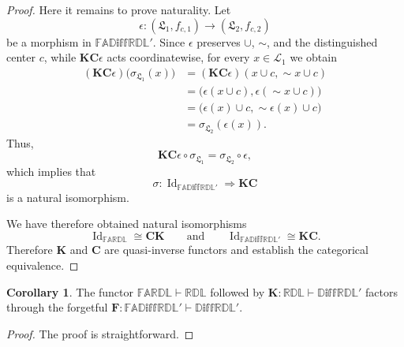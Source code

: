 \documentclass[final,12pt,times]{elsarticle}
\theoremstyle{plain}
\theoremstyle{definition}
\newtheorem{corollary}[definition]{Corollary}
\theoremstyle{break}
\begin{document}
\begin{proof}
Here it remains to prove naturality. Let
\[
\epsilon:(\boldsymbol{\mathfrak{L}}_1,f_{c,1})
  \longrightarrow(\boldsymbol{\mathfrak{L}}_2,f_{c,2})
\]
be a morphism in $\mathbb{FAD\text{iff}RDL'}$. Since $\epsilon$ preserves $\cup$, $\sim$, and the distinguished center $c$, while $\mathbf{K}\mathbf{C}\epsilon$ acts coordinatewise, for every $x\in\mathcal{L}_1$ we obtain
\[
\begin{aligned}
(\mathbf{K}\mathbf{C}\epsilon)
   \bigl(\sigma_{\boldsymbol{\mathfrak{L}}_1}(x)\bigr)
  &=(\mathbf{K}\mathbf{C}\epsilon)(x\cup c,\sim x\cup c)\\
  &=\bigl(\epsilon(x\cup c),\epsilon(\sim x\cup c)\bigr)\\
  &=\bigl(\epsilon(x)\cup c,\sim\epsilon(x)\cup c\bigr)\\
  &=\sigma_{\boldsymbol{\mathfrak{L}}_2}(\epsilon(x)).
\end{aligned}
\]
Thus,
\[
\mathbf{K}\mathbf{C}\epsilon\circ\sigma_{\boldsymbol{\mathfrak{L}}_1}
   =\sigma_{\boldsymbol{\mathfrak{L}}_2}\circ\epsilon,
\]
which implies that
\[
\sigma:\operatorname{Id}_{\mathbb{FAD\text{iff}RDL'}}
   \Longrightarrow\mathbf{K}\mathbf{C}
\]
is a natural isomorphism.

We have therefore obtained natural isomorphisms
\[
\operatorname{Id}_{\mathbb{FARDL}}\cong\mathbf{C}\mathbf{K}
\qquad\text{and}\qquad
\operatorname{Id}_{\mathbb{FAD\text{iff}RDL'}}\cong\mathbf{K}\mathbf{C}.
\]
Therefore $\mathbf{K}$ and $\mathbf{C}$ are quasi-inverse functors and establish the categorical equivalence.
\end{proof}

\begin{corollary}\label{corollary5.16}
    The functor $\mathbb{FARDL}\vdash \mathbb{RDL}$ followed by $\mathbf{K}:\mathbb{RDL}\vdash \mathbb{D\text{iff}RDL'}$ factors through the forgetful $\mathbf{F}:\mathbb {FAD\text{iff}RDL'}\vdash  \mathbb{D\text{iff}RDL'}$.
\end{corollary}
\begin{proof} The proof is straightforward.
\end{proof}
\end{document}
